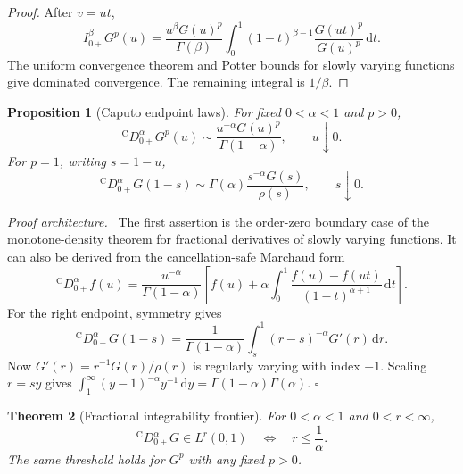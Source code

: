 \documentclass[11pt,oneside]{article}
\newtheorem{theorem}{Theorem}[section]
\newtheorem{proposition}[theorem]{Proposition}
\theoremstyle{definition}
\theoremstyle{remark}
\newcommand{\dd}{\,\mathrm d}
\newcommand{\Caputo}{\mathrm C}
\newenvironment{proofidea}{\par\smallskip\noindent\textit{Proof architecture.}\ }{\hfill$\square$\par\smallskip}
\begin{document}
\begin{proof}
After $v=ut$,
\begin{equation}
 I_{0+}^{\beta}G^p(u)
 =\frac{u^\beta G(u)^p}{\Gamma(\beta)}
  \int_0^1(1-t)^{\beta-1}
  \frac{G(ut)^p}{G(u)^p}\dd t.
\end{equation}
The uniform convergence theorem and Potter bounds for slowly varying
functions give dominated convergence.  The remaining integral is $1/\beta$.
\end{proof}

\begin{proposition}[Caputo endpoint laws]
\label{prop:caputo-endpoints}
For fixed $0<\alpha<1$ and $p>0$,
\begin{equation}
 {}^{\Caputo}D_{0+}^{\alpha}G^p(u)
 \sim\frac{u^{-\alpha}G(u)^p}{\Gamma(1-\alpha)},
 \qquad u\downarrow0.
 \label{eq:caputo-left-leading}
\end{equation}
For $p=1$, writing $s=1-u$,
\begin{equation}
 {}^{\Caputo}D_{0+}^{\alpha}G(1-s)
 \sim\Gamma(\alpha)
 \frac{s^{-\alpha}G(s)}{\rho(s)},
 \qquad s\downarrow0.
 \label{eq:caputo-right-leading}
\end{equation}
\end{proposition}

\begin{proofidea}
The first assertion is the order-zero boundary case of the monotone-density
theorem for fractional derivatives of slowly varying functions.  It can also
be derived from the cancellation-safe Marchaud form
\begin{equation}
 {}^{\Caputo}D_{0+}^{\alpha}f(u)
 =\frac{u^{-\alpha}}{\Gamma(1-\alpha)}\left[
 f(u)+\alpha\int_0^1
 \frac{f(u)-f(ut)}{(1-t)^{\alpha+1}}\dd t
 \right].
\end{equation}
For the right endpoint, symmetry gives
\begin{equation}
 {}^{\Caputo}D_{0+}^{\alpha}G(1-s)
 =\frac1{\Gamma(1-\alpha)}
  \int_s^1(r-s)^{-\alpha}G'(r)\dd r.
\end{equation}
Now $G'(r)=r^{-1}G(r)/\rho(r)$ is regularly varying with index $-1$.
Scaling $r=sy$ gives
$\int_1^\infty(y-1)^{-\alpha}y^{-1}\dd y
=\Gamma(1-\alpha)\Gamma(\alpha)$.
\end{proofidea}

\begin{theorem}[Fractional integrability frontier]
\label{thm:caputo-Lp}
For $0<\alpha<1$ and $0<r<\infty$,
\begin{equation}
 {}^{\Caputo}D_{0+}^{\alpha}G\in L^r(0,1)
 \quad\Longleftrightarrow\quad
 r\le\frac1\alpha.
 \label{eq:caputo-Lp-frontier}
\end{equation}
The same threshold holds for $G^p$ with any fixed $p>0$.
\end{theorem}
\end{document}
